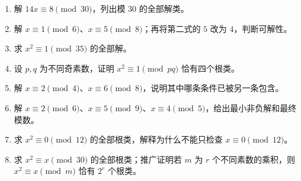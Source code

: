 \begin{enumerate}
 \item 解 $14x\equiv8\pmod{30}$，列出模 $30$ 的全部解类。
 \item 解 $x\equiv1\pmod6$、$x\equiv5\pmod8$；再将第二式的 $5$ 改为 $4$，判断可解性。
 \item 求 $x^2\equiv1\pmod{35}$ 的全部解。
 \item 设 $p,q$ 为不同奇素数，证明 $x^2\equiv1\pmod{pq}$ 恰有四个根类。
 \item\label{ex:crt-redundant} 解 $x\equiv2\pmod4$、$x\equiv6\pmod8$，说明其中哪条条件已被另一条包含。
 \item\label{ex:crt-three} 解 $x\equiv2\pmod6$、$x\equiv5\pmod9$、$x\equiv4\pmod5$，给出最小非负解和最终模数。
 \item\label{ex:crt-zero-roots} 求 $x^2\equiv0\pmod{12}$ 的全部根类，解释为什么不能只检查 $x\equiv0\pmod{12}$。
 \item\label{ex:crt-idempotents} 求 $x^2\equiv x\pmod{30}$ 的全部根类；推广证明若 $m$ 为 $r$ 个不同素数的乘积，则 $x^2\equiv x\pmod m$ 恰有 $2^r$ 个根类。
\end{enumerate}

